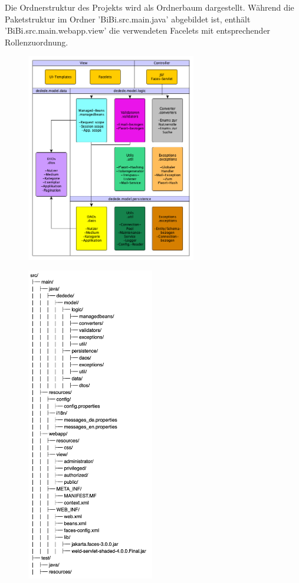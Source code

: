\documentclass{article}
\begin{document}
Die Ordnerstruktur des Projekts wird als Ordnerbaum dargestellt.
Während die Paketstruktur im Ordner 'BiBi.src.main.java' abgebildet ist, enthält 'BiBi.src.main.webapp.view' die verwendeten Facelets mit entsprechender Rollenzuordnung. \vspace{0.5em}

\begin{figure}[h]

\end{figure}

\begin{figure}[h]
	\centering
	\includegraphics[width = 20em]{Modeldiagramm}
\end{figure}
\begin{figure}[h]
	\centering
	\includegraphics[width = 15em]{FileStructure}
\end{figure}
\end{document}
